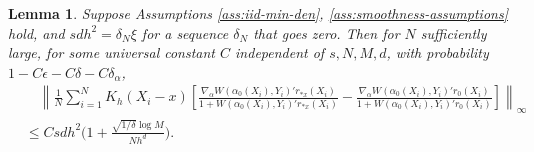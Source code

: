 \documentclass[11pt]{article}
\newtheorem{lemma}{Lemma}
\begin{document}
\begin{lemma}\label{Lemma:xi-bound}
Suppose Assumptions \ref{ass:iid-min-den}, \ref{ass:smoothness-assumptions} hold, and $sdh^2 = \delta_N\xi$ for a sequence $\delta_N$ that goes zero. Then for $N$ sufficiently large, for some universal constant $C$ independent of $s,N,M,d$, with probability $1-C\epsilon-C\delta-C\delta_{\alpha}$, 
$$\begin{array}{rl}
&\displaystyle\quad\left\|\frac{1}{N}\sum_{i=1}^NK_h(X_i-x)\left[\frac{\nabla_{\alpha}W(\alpha_0(X_i),Y_i)'r_{*x}(X_i)}{1+W(\alpha_0(X_i),Y_i)'r_{*x}(X_i)}-\frac{\nabla_{\alpha}W(\alpha_0(X_i),Y_i)'r_0(X_i)}{1+W(\alpha_0(X_i),Y_i)'r_0(X_i)}\right]\right\|_\infty\\
&\displaystyle\leq Csdh^2\bigg(1 \!+\!\frac{\sqrt{1/\delta}\log M}{Nh^d}\!\bigg).
\end{array}$$
\end{lemma}
\end{document}
